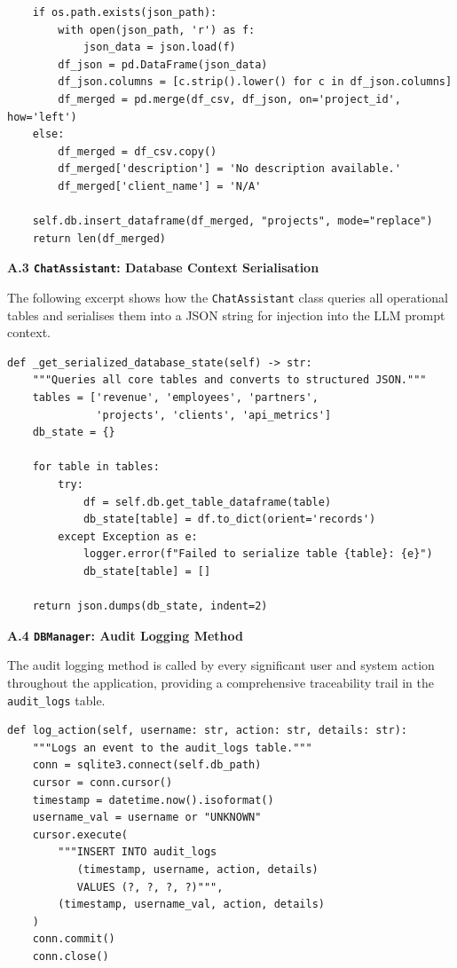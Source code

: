 \documentclass{book}
\begin{document}
\begin{appendices}
\begin{verbatim}
    if os.path.exists(json_path):
        with open(json_path, 'r') as f:
            json_data = json.load(f)
        df_json = pd.DataFrame(json_data)
        df_json.columns = [c.strip().lower() for c in df_json.columns]
        df_merged = pd.merge(df_csv, df_json, on='project_id', how='left')
    else:
        df_merged = df_csv.copy()
        df_merged['description'] = 'No description available.'
        df_merged['client_name'] = 'N/A'

    self.db.insert_dataframe(df_merged, "projects", mode="replace")
    return len(df_merged)
\end{verbatim}

\vspace{0.5cm}
\noindent\textbf{A.3 \texttt{ChatAssistant}: Database Context Serialisation}

\noindent The following excerpt shows how the \texttt{ChatAssistant} class queries all operational tables and serialises them into a JSON string for injection into the LLM prompt context.

\begin{verbatim}
def _get_serialized_database_state(self) -> str:
    """Queries all core tables and converts to structured JSON."""
    tables = ['revenue', 'employees', 'partners',
              'projects', 'clients', 'api_metrics']
    db_state = {}

    for table in tables:
        try:
            df = self.db.get_table_dataframe(table)
            db_state[table] = df.to_dict(orient='records')
        except Exception as e:
            logger.error(f"Failed to serialize table {table}: {e}")
            db_state[table] = []

    return json.dumps(db_state, indent=2)
\end{verbatim}

\vspace{0.5cm}
\noindent\textbf{A.4 \texttt{DBManager}: Audit Logging Method}

\noindent The audit logging method is called by every significant user and system action throughout the application, providing a comprehensive traceability trail in the \texttt{audit\_logs} table.

\begin{verbatim}
def log_action(self, username: str, action: str, details: str):
    """Logs an event to the audit_logs table."""
    conn = sqlite3.connect(self.db_path)
    cursor = conn.cursor()
    timestamp = datetime.now().isoformat()
    username_val = username or "UNKNOWN"
    cursor.execute(
        """INSERT INTO audit_logs
           (timestamp, username, action, details)
           VALUES (?, ?, ?, ?)""",
        (timestamp, username_val, action, details)
    )
    conn.commit()
    conn.close()
\end{verbatim}


\end{appendices}
\end{document}
